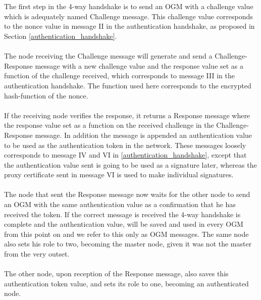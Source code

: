 \noindent
\\\\
The first step in the 4-way handshake is to send an OGM with a challenge value which is adequately named Challenge message. This challenge value corresponds to the nonce value in message II in the authentication handshake, as proposed in Section \ref{authentication_handshake}.
\\\\
The node receiving the Challenge message will generate and send a Challenge-Response message with a new challenge value and the response value set as a function of the challenge received, which corresponds to message III in the authentication handshake. The function used here corresponds to the encrypted hash-function of the nonce.
\\\\
If the receiving node verifies the response, it returns a Response message where the response value set as a function on the received challenge in the Challenge-Response message. In addition the message is appended an authentication value to be used as the authentication token in the network. These messages loosely corresponds to message IV and VI in \ref{authentication_handshake}, except that the authentication value sent is going to be used as a signature later, whereas the proxy certificate sent in message VI is used to make individual signatures.
\\\\
The node that sent the Response message now waits for the other node to send an OGM with the same authentication value as a confirmation that he has received the token. If the correct message is received the 4-way handshake is complete and the authentication value, will be saved and used in every OGM from this point on and we refer to this only as OGM messages. The same node also sets his role to two, becoming the master node, given it was not the master from the very outset.
\\\\
The other node, upon reception of the Response message, also saves this authentication token value, and sets its role to one, becoming an authenticated node.

